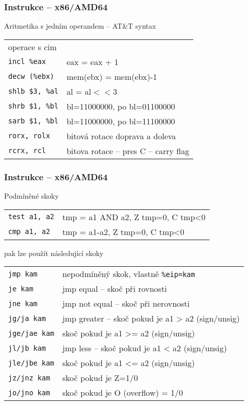 \documentclass{beamer}
\begin{document}
\begin{frame}
\frametitle{Instrukce – x86/AMD64}
Aritmetika s jedním operandem -- AT\&T syntax
\begin{tabular}{ l l}
operace   s cim&\\
\texttt{incl            \%eax} &              eax = eax + 1\\
\texttt{decw            (\%ebx)} &                 mem(ebx) = mem(ebx)-1\\
\texttt{shlb            \$3, \%al} &                al = al$<<$3\\
\texttt{shrb            \$1, \%bl} &                bl=11000000, po bl=01100000\\
\texttt{sarb            \$1, \%bl} &                bl=11000000, po bl=11100000\\
\texttt{rorx, rolx} & bitová rotace doprava a doleva\\
\texttt{rcrx, rcl} & bitova rotace – pres C -- carry flag\\
\end{tabular}
\end{frame}


\begin{frame}
\frametitle{Instrukce – x86/AMD64}
Podmíněné skoky\\
\begin{tabular}{ l l}
\texttt{test    a1, a2} &  tmp = a1 AND a2, Z tmp=0, C tmp<0\\
\texttt{cmp     a1, a2} &  tmp = a1-a2, Z tmp=0, C tmp<0\\
\end{tabular}

pak lze použít následující skoky
\begin{tabular}{ l l}
\texttt{jmp kam} & nepodmíněný skok, vlastně \texttt{\%eip=kam}\\
\texttt{je      kam} & jmp equal -- skoč při rovnosti\\
\texttt{jne kam} & jmp not equal -- skoč při nerovnosti\\
\texttt{jg/ja kam} & jmp greater – skoč pokud je a1 > a2 (sign/unsig)\\
\texttt{jge/jae kam} & skoč pokud je a1 >= a2 (sign/unsig)\\
\texttt{jl/jb kam} & jmp less – skoč pokud je a1 < a2 (sign/unsig)\\
\texttt{jle/jbe kam} & skoč pokud je a1 <= a2 (sign/unsig)\\
\texttt{jz/jnz kam} & skoč pokud je Z=1/0\\
\texttt{jo/jno kam}& skoč pokud je O (overflow) = 1/0\\
\end{tabular}
\end{frame}
\end{document}
